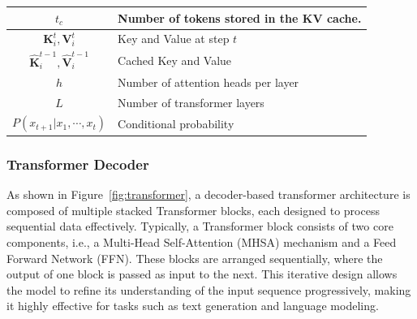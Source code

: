 \begin{table}[t]
\begin{tabular}{c|l}
        $t_c$ & Number of tokens stored in the KV cache. \\ \hline
        
        $\mathbf{K}_i^t, \mathbf{V}_i^t$ & Key and Value at step $t$ \\ \hline        
        $\mathbf{\hat{K}}_i^{t-1}, \mathbf{\hat{V}}_i^{t-1}$ & Cached Key and Value \\\hline
        
        $h$ & Number of attention heads per layer \\\hline
        
        
        $L$ & Number of transformer layers \\\hline
        
        
        
        $P(x_{t+1} | x_1, \cdots, x_t)$ & Conditional probability \\
        \bottomrule
    \end{tabular}
\end{table}

\subsubsection{Transformer Decoder}\label{ssec:decoder}
As shown in Figure~\ref{fig:transformer}, a decoder-based transformer architecture is composed of multiple stacked Transformer blocks, each designed to process sequential data effectively. 
Typically, a Transformer block consists of two core components, i.e., a Multi-Head Self-Attention (MHSA) mechanism and a Feed Forward Network (FFN). 
These blocks are arranged sequentially, where the output of one block is passed as input to the next. This iterative design allows the model to refine its understanding of the input sequence progressively, making it highly effective for tasks such as text generation and language modeling.


